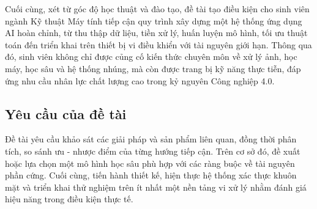 Cuối cùng, xét từ góc độ học thuật và đào tạo, đề tài tạo điều kiện cho sinh viên ngành Kỹ thuật Máy tính tiếp cận quy trình xây dựng một hệ thống ứng dụng AI hoàn chỉnh, từ thu thập dữ liệu, tiền xử lý, huấn luyện mô hình, tối ưu thuật toán đến triển khai trên thiết bị vi điều khiển với tài nguyên giới hạn. Thông qua đó, sinh viên không chỉ được củng cố kiến thức chuyên môn về xử lý ảnh, học máy, học sâu và hệ thống nhúng, mà còn được trang bị kỹ năng thực tiễn, đáp ứng nhu cầu nhân lực chất lượng cao trong kỷ nguyên Công nghiệp 4.0.

\subsection{Yêu cầu của đề tài}
Đề tài yêu cầu khảo sát các giải pháp và sản phẩm liên quan, đồng thời phân tích, so sánh ưu - nhược điểm của từng hướng tiếp cận. Trên cơ sở đó, đề xuất hoặc lựa chọn một mô hình học sâu phù hợp với các ràng buộc về tài nguyên phần cứng. Cuối cùng, tiến hành thiết kế, hiện thực hệ thống xác thực khuôn mặt và triển khai thử nghiệm trên ít nhất một nền tảng vi xử lý nhằm đánh giá hiệu năng trong điều kiện thực tế.